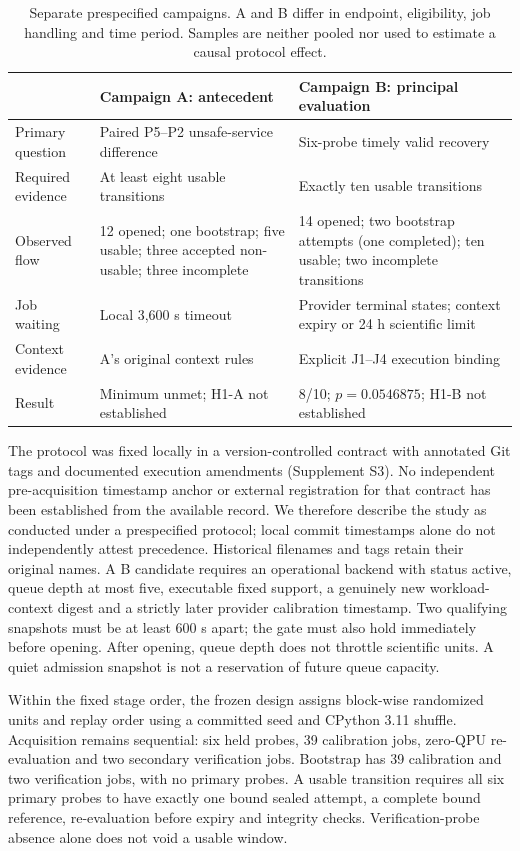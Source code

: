 \documentclass[pdflatex,sn-mathphys-num]{sn-jnl}
\begin{document}
\begin{table}[htbp]\centering\small
\begin{tabularx}{\linewidth}{p{.20\linewidth}YY}\toprule
 & Campaign A: antecedent & Campaign B: principal evaluation\\\midrule
Primary question & Paired P5--P2 unsafe-service difference & Six-probe timely valid recovery\\
Required evidence & At least eight usable transitions & Exactly ten usable transitions\\
Observed flow & 12 opened; one bootstrap; five usable; three accepted non-usable; three incomplete & 14 opened; two bootstrap attempts (one completed); ten usable; two incomplete transitions\\
Job waiting & Local 3,600 s timeout & Provider terminal states; context expiry or 24 h scientific limit\\
Context evidence & A's original context rules & Explicit J1--J4 execution binding\\
Result & Minimum unmet; H1-A not established & 8/10; $p=0.0546875$; H1-B not established\\\bottomrule
\end{tabularx}
\caption{Separate prespecified campaigns. A and B differ in endpoint, eligibility, job handling and time period. Samples are neither pooled nor used to estimate a causal protocol effect.}\label{tab:campaigns}
\end{table}

The protocol was fixed locally in a version-controlled contract with annotated Git tags and documented execution amendments (Supplement S3). No independent pre-acquisition timestamp anchor or external registration for that contract has been established from the available record. We therefore describe the study as conducted under a prespecified protocol; local commit timestamps alone do not independently attest precedence. Historical filenames and tags retain their original names. A B candidate requires an operational backend with status active, queue depth at most five, executable fixed support, a genuinely new workload-context digest and a strictly later provider calibration timestamp. Two qualifying snapshots must be at least 600 s apart; the gate must also hold immediately before opening. After opening, queue depth does not throttle scientific units. A quiet admission snapshot is not a reservation of future queue capacity.

Within the fixed stage order, the frozen design assigns block-wise randomized units and replay order using a committed seed and CPython 3.11 shuffle. Acquisition remains sequential: six held probes, 39 calibration jobs, zero-QPU re-evaluation and two secondary verification jobs. Bootstrap has 39 calibration and two verification jobs, with no primary probes. A usable transition requires all six primary probes to have exactly one bound sealed attempt, a complete bound reference, re-evaluation before expiry and integrity checks. Verification-probe absence alone does not void a usable window.
\end{document}
